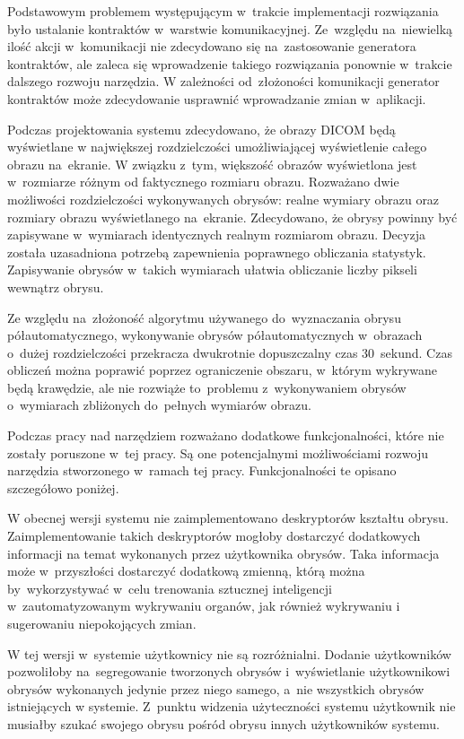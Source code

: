 \documentclass[a4paper,11pt,twoside,openright]{report}
\theoremstyle{definition}
\begin{document}
Podstawowym problemem występującym w~trakcie implementacji rozwiązania było
ustalanie kontraktów w~warstwie komunikacyjnej. Ze~względu na~niewielką ilość
akcji w~komunikacji nie zdecydowano się na~zastosowanie generatora kontraktów,
ale zaleca się wprowadzenie takiego rozwiązania ponownie w~trakcie dalszego rozwoju narzędzia.
W zależności od~złożoności komunikacji generator kontraktów może zdecydowanie
usprawnić wprowadzanie zmian w~aplikacji.

Podczas projektowania systemu zdecydowano, że obrazy DICOM będą wyświetlane w
największej rozdzielczości umożliwiającej wyświetlenie całego obrazu na~ekranie.
W związku z~tym, większość obrazów wyświetlona jest w~rozmiarze różnym od
faktycznego rozmiaru obrazu. Rozważano dwie możliwości rozdzielczości wykonywanych
obrysów: realne wymiary obrazu oraz rozmiary obrazu wyświetlanego na~ekranie.
Zdecydowano, że obrysy powinny być zapisywane w~wymiarach identycznych realnym
rozmiarom obrazu. Decyzja została uzasadniona potrzebą zapewnienia poprawnego
obliczania statystyk. Zapisywanie obrysów w~takich wymiarach ułatwia obliczanie
liczby pikseli wewnątrz obrysu.

Ze względu na~złożoność algorytmu używanego do~wyznaczania obrysu półautomatycznego,
wykonywanie obrysów półautomatycznych w~obrazach o~dużej rozdzielczości przekracza
dwukrotnie dopuszczalny czas 30~sekund. Czas
obliczeń można poprawić poprzez ograniczenie obszaru, w~którym wykrywane będą
krawędzie, ale nie rozwiąże to~problemu z~wykonywaniem obrysów o~wymiarach
zbliżonych do~pełnych wymiarów obrazu.

Podczas pracy nad narzędziem rozważano dodatkowe funkcjonalności, które nie zostały
poruszone w~tej pracy. Są one potencjalnymi możliwościami rozwoju narzędzia
stworzonego w~ramach tej pracy. Funkcjonalności te opisano szczegółowo poniżej.

W obecnej wersji systemu nie zaimplementowano deskryptorów kształtu obrysu.
Zaimplementowanie takich deskryptorów mogłoby dostarczyć dodatkowych informacji
na temat wykonanych przez użytkownika obrysów. Taka informacja może w~przyszłości
dostarczyć dodatkową zmienną, którą można by~wykorzystywać w~celu trenowania
sztucznej inteligencji w~zautomatyzowanym wykrywaniu organów, jak również wykrywaniu
i sugerowaniu niepokojących zmian.

W tej wersji w~systemie użytkownicy nie są rozróżnialni. Dodanie użytkowników
pozwoliłoby na~segregowanie tworzonych obrysów i~wyświetlanie użytkownikowi
obrysów wykonanych jedynie przez niego samego, a~nie wszystkich obrysów istniejących
w systemie. Z~punktu widzenia użyteczności systemu użytkownik nie musiałby szukać
swojego obrysu pośród obrysu innych użytkowników systemu.
\end{document}
